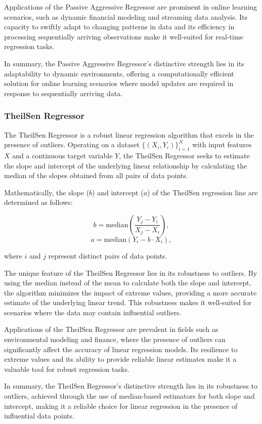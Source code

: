 \documentclass[twocolumn]{article}
\begin{document}
Applications of the Passive Aggressive Regressor are prominent in online learning scenarios, such as dynamic financial modeling and streaming data analysis. Its capacity to swiftly adapt to changing patterns in data and its efficiency in processing sequentially arriving observations make it well-suited for real-time regression tasks.

In summary, the Passive Aggressive Regressor's distinctive strength lies in its adaptability to dynamic environments, offering a computationally efficient solution for online learning scenarios where model updates are required in response to sequentially arriving data.

		\subsubsection{TheilSen Regressor}
The TheilSen Regressor is a robust linear regression algorithm that excels in the presence of outliers. Operating on a dataset \(\{(X_i, Y_i)\}_{i=1}^{N}\) with input features \(X\) and a continuous target variable \(Y\), the TheilSen Regressor seeks to estimate the slope and intercept of the underlying linear relationship by calculating the median of the slopes obtained from all pairs of data points.

Mathematically, the slope (\(b\)) and intercept (\(a\)) of the TheilSen regression line are determined as follows:

\[ b = \text{median}\left(\frac{Y_j - Y_i}{X_j - X_i}\right), \]
\[ a = \text{median}(Y_i - b \cdot X_i), \]

where \(i\) and \(j\) represent distinct pairs of data points.

The unique feature of the TheilSen Regressor lies in its robustness to outliers. By using the median instead of the mean to calculate both the slope and intercept, the algorithm minimizes the impact of extreme values, providing a more accurate estimate of the underlying linear trend. This robustness makes it well-suited for scenarios where the data may contain influential outliers.

Applications of the TheilSen Regressor are prevalent in fields such as environmental modeling and finance, where the presence of outliers can significantly affect the accuracy of linear regression models. Its resilience to extreme values and its ability to provide reliable linear estimates make it a valuable tool for robust regression tasks.

In summary, the TheilSen Regressor's distinctive strength lies in its robustness to outliers, achieved through the use of median-based estimators for both slope and intercept, making it a reliable choice for linear regression in the presence of influential data points.
\end{document}
